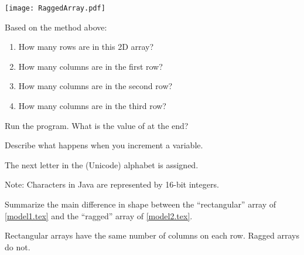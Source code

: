 

\begin{center}
\texttt{[image: RaggedArray.pdf]}
\end{center}




\Q Based on the  method above:

\setlength{\defaultwidth}{3em}

\begin{enumerate}
\item How many rows are in this 2D array?     
\item How many columns are in the first row?  
\item How many columns are in the second row? 
\item How many columns are in the third row?  
\end{enumerate}

\vspace{-1ex}


\Q Run the program. What is the value of  at the end? 

\vspace{1ex}


\Q Describe what happens when you increment a  variable.

\begin{answer}[3em]
The next letter in the (Unicode) alphabet is assigned.

\medskip
Note: Characters in Java are represented by 16-bit integers.
\end{answer}


\Q Summarize the main difference in shape between the ``rectangular'' array of \ref{model1.tex} and the ``ragged'' array of \ref{model2.tex}.

\begin{answer}[3em]
Rectangular arrays have the same number of columns on each row.
Ragged arrays do not.
\end{answer}


%



